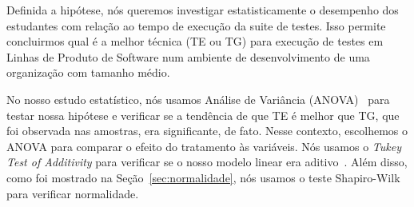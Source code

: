 Definida a hipótese, nós queremos investigar estatisticamente o desempenho dos estudantes com relação ao tempo de execução da suite de testes. Isso permite concluirmos qual é a melhor técnica (TE ou TG) para execução de testes em Linhas de Produto de Software num ambiente de desenvolvimento de uma organização com tamanho médio.

No nosso estudo estatístico, nós usamos Análise de Variância (ANOVA)~\cite{Wohlin2000teste} para testar nossa hipótese e verificar se a tendência de que TE é melhor que TG, que foi observada nas amostras, era significante, de fato. Nesse contexto, escolhemos o ANOVA para comparar o efeito do tratamento às variáveis. Nós usamos o \emph{Tukey Test of Additivity} para verificar se o nosso modelo linear era aditivo~\cite{citeulike:2905018}. Além disso, como foi mostrado na Seção~\ref{sec:normalidade}, nós usamos o teste Shapiro-Wilk para verificar normalidade.